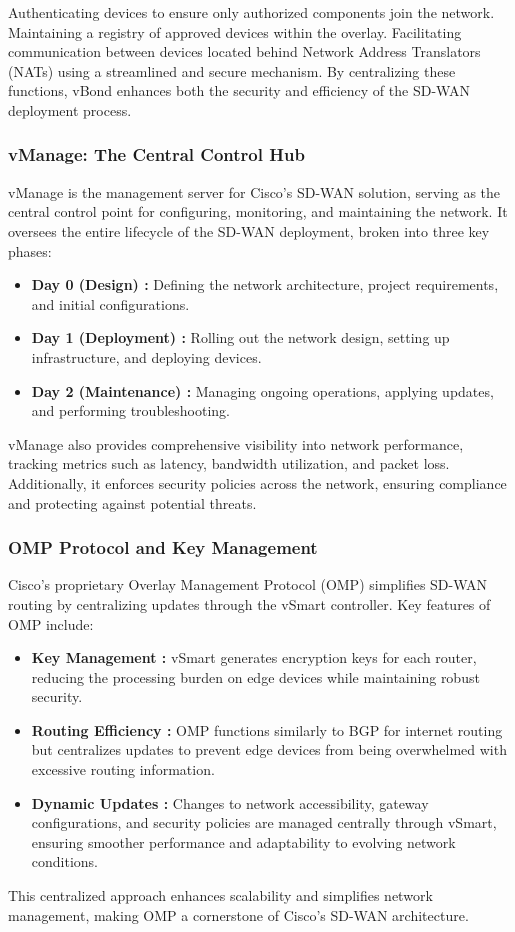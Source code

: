 \documentclass[12pt,english]{report}
\begin{document}
Authenticating devices to ensure only authorized components join the network.
Maintaining a registry of approved devices within the overlay.
Facilitating communication between devices located behind Network Address Translators (NATs) using a streamlined and secure mechanism.
By centralizing these functions, vBond enhances both the security and efficiency of the SD-WAN deployment process\cite{ref4}.
\subsubsection{vManage: The Central Control Hub}
vManage is the management server for Cisco’s SD-WAN solution, serving as the central control point for configuring, monitoring, and maintaining the network. It oversees the entire lifecycle of the SD-WAN deployment, broken into three key phases:
        \begin{itemize}
            \item \textbf{Day 0 (Design) :} Defining the network architecture, project requirements, and initial configurations.
            \item \textbf{Day 1 (Deployment) : }Rolling out the network design, setting up infrastructure, and deploying devices.
            \item \textbf{Day 2 (Maintenance) :} Managing ongoing operations, applying updates, and performing troubleshooting.
        \end{itemize}
vManage also provides comprehensive visibility into network performance, tracking metrics such as latency, bandwidth utilization, and packet loss. Additionally, it enforces security policies across the network, ensuring compliance and protecting against potential threats\cite{ref4}.
\subsubsection{OMP Protocol and Key Management}
Cisco’s proprietary Overlay Management Protocol (OMP) simplifies SD-WAN routing by centralizing updates through the vSmart controller. Key features of OMP include:
        \begin{itemize}
            \item \textbf{Key Management :} vSmart generates encryption keys for each router, reducing the processing burden on edge devices while maintaining robust security.
            \item \textbf{Routing Efficiency :} OMP functions similarly to BGP for internet routing but centralizes updates to prevent edge devices from being overwhelmed with excessive routing information.
            \item \textbf{Dynamic Updates :} Changes to network accessibility, gateway configurations, and security policies are managed centrally through vSmart, ensuring smoother performance and adaptability to evolving network conditions.
        \end{itemize}
This centralized approach enhances scalability and simplifies network management, making OMP a cornerstone of Cisco’s SD-WAN architecture\cite{ref4}.
\end{document}
